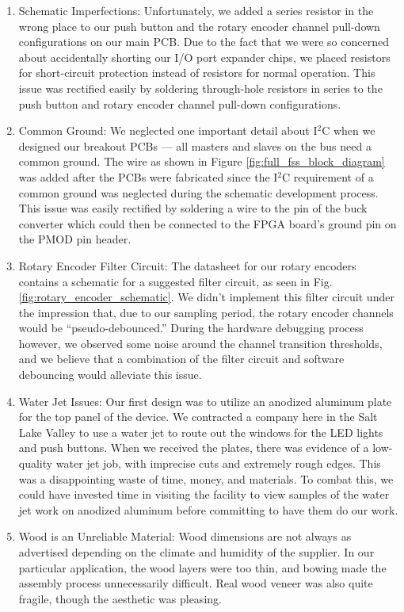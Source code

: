 \documentclass[conference]{IEEEtran}
\begin{document}
\begin{enumerate}
  \item Schematic Imperfections: Unfortunately, we added a series resistor in the wrong place to our push button and the rotary encoder channel pull-down configurations on our main PCB. Due to the fact that we were so concerned about accidentally shorting our I/O port expander chips, we placed resistors for short-circuit protection instead of resistors for normal operation. This issue was rectified easily by soldering through-hole resistors in series to the push button and rotary encoder channel pull-down configurations.
  \item Common Ground: We neglected one important detail about I$^2$C when we designed our breakout PCBs --- all masters and slaves on the bus need a common ground. The  wire as shown in Figure \ref{fig:full_fss_block_diagram} was added after the PCBs were fabricated since the I$^2$C requirement of a common ground was neglected during the schematic development process. This issue was easily rectified by soldering a wire to the  pin of the buck converter which could then be connected to the FPGA board's ground pin on the PMOD pin header.
  \item Rotary Encoder Filter Circuit: The datasheet for our rotary encoders contains a schematic for a suggested filter circuit, as seen in Fig. \ref{fig:rotary_encoder_schematic}. We didn't implement this filter circuit under the impression that, due to our sampling period, the rotary encoder channels would be ``pseudo-debounced.'' During the hardware debugging process however, we observed some noise around the channel transition thresholds, and we believe that a combination of the filter circuit and software debouncing would alleviate this issue.
  \item Water Jet Issues: Our first design was to utilize an anodized aluminum plate for the top panel of the device. We contracted a company here in the Salt Lake Valley to use a water jet to route out the windows for the LED lights and push buttons. When we received the plates, there was evidence of a low-quality water jet job, with imprecise cuts and extremely rough edges. This was a disappointing waste of time, money, and materials. To combat this, we could have invested time in visiting the facility to view samples of the water jet work on anodized aluminum before committing to have them do our work.
  \item Wood is an Unreliable Material: Wood dimensions are not always as advertised depending on the climate and humidity of the supplier. In our particular application, the wood layers were too thin, and bowing made the assembly process unnecessarily difficult. Real wood veneer was also quite fragile, though the aesthetic was pleasing.

\end{enumerate}
\end{document}
